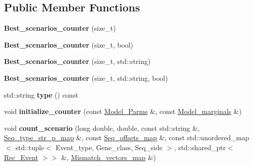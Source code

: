 \subsection*{Public Member Functions}
\begin{DoxyCompactItemize}
\item 
\mbox{\label{classBest__scenarios__counter_a1b02d09cb90d48901973a522879dbe11}} 
{\bfseries Best\+\_\+scenarios\+\_\+counter} (size\+\_\+t)
\item 
\mbox{\label{classBest__scenarios__counter_a825bfa56893618db010d7bdd0a05fe11}} 
{\bfseries Best\+\_\+scenarios\+\_\+counter} (size\+\_\+t, bool)
\item 
\mbox{\label{classBest__scenarios__counter_a114a7eb723e63731f210436068ffa786}} 
{\bfseries Best\+\_\+scenarios\+\_\+counter} (size\+\_\+t, std\+::string)
\item 
\mbox{\label{classBest__scenarios__counter_aabb594bc5fe34333cd31d4e33ddf7f3e}} 
{\bfseries Best\+\_\+scenarios\+\_\+counter} (size\+\_\+t, std\+::string, bool)
\item 
\mbox{\label{classBest__scenarios__counter_abb0a6a0997f579afb2ae3824a90ad2d0}} 
std\+::string {\bfseries type} () const
\item 
\mbox{\label{classBest__scenarios__counter_ae5027552709dfc54fe972dfaae5e5a76}} 
void {\bfseries initialize\+\_\+counter} (const \hyperlink{classModel__Parms}{Model\+\_\+\+Parms} \&, const \hyperlink{classModel__marginals}{Model\+\_\+marginals} \&)
\item 
\mbox{\label{classBest__scenarios__counter_ad5c78463063ea4223c489ca2e8678b31}} 
void {\bfseries count\+\_\+scenario} (long double, double, const std\+::string \&, \hyperlink{classEnum__fast__memory__map}{Seq\+\_\+type\+\_\+str\+\_\+p\+\_\+map} \&, const \hyperlink{classEnum__fast__memory__dual__key__map}{Seq\+\_\+offsets\+\_\+map} \&, const std\+::unordered\+\_\+map$<$ std\+::tuple$<$ Event\+\_\+type, Gene\+\_\+class, Seq\+\_\+side $>$, std\+::shared\+\_\+ptr$<$ \hyperlink{classRec__Event}{Rec\+\_\+\+Event} $>$$>$ \&, \hyperlink{classEnum__fast__memory__map}{Mismatch\+\_\+vectors\+\_\+map} \&)
$$
\end{DoxyCompactItemize}
